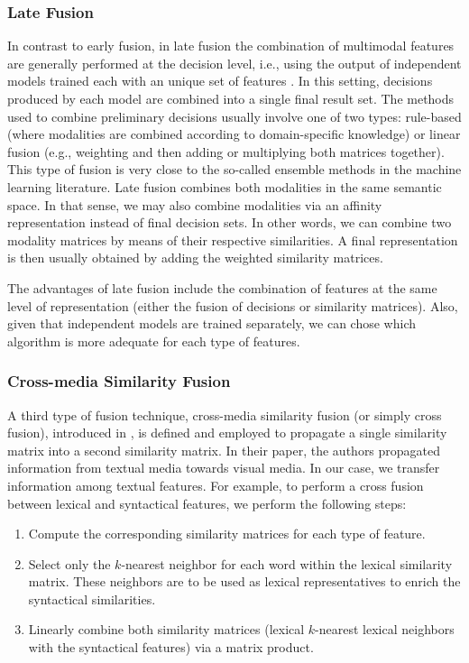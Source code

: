 \documentclass{llncs}
\begin{document}
\subsubsection{Late Fusion}
In contrast to early fusion, in late fusion the combination of multimodal features are generally performed at the decision level, i.e., using the output of independent models trained  each with an unique set of features \cite{ClinchantAC11}. In this setting,  decisions produced by each model are combined into a single final result set.
%
The methods used to combine preliminary decisions usually involve one of two types: rule-based (where modalities are combined according to domain-specific knowledge) or linear fusion (e.g., weighting and then adding or multiplying both matrices together). This type of fusion is very close to the so-called ensemble methods in the machine learning literature.
%
Late fusion combines both modalities in the same semantic space. In that sense,  we may also combine modalities via an affinity representation instead of final decision sets. In other words, we can combine two modality matrices by means of their respective similarities. A final representation is then usually obtained by adding the weighted similarity matrices.
%

The advantages of late fusion include the combination of features at the same level of representation (either the fusion of decisions or similarity matrices). Also, given that independent models are trained separately, we can chose which algorithm is more adequate for each type of
features.

\subsubsection{Cross-media Similarity Fusion}
%
A third type of fusion technique, cross-media similarity fusion (or simply cross fusion),   introduced in \cite{Ah-PineCC15,ClinchantAC11}, is defined and employed to propagate a single similarity matrix into a second similarity matrix. In their paper, the authors propagated information from textual media towards visual media. In our case, we transfer information among textual features. For example, to perform a cross fusion between lexical and syntactical features, we perform the following steps: 
\begin{enumerate}
\item Compute the corresponding similarity matrices for each type of feature.
\item Select only the $k$-nearest neighbor for each word within the lexical similarity matrix. These neighbors are to be used as lexical representatives to enrich the syntactical similarities.
\item Linearly combine both similarity matrices (lexical $k$-nearest lexical neighbors with the syntactical features) via a matrix product.
\end{enumerate}  
\end{document}

